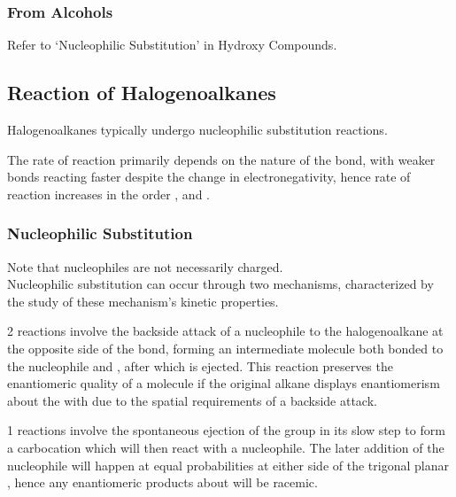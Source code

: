 \documentclass[../main]{subfiles}
\begin{document}
	\subsubsection{From Alcohols}

	Refer to `Nucleophilic Substitution' in Hydroxy Compounds.

	\subsection{Reaction of Halogenoalkanes}

	Halogenoalkanes typically undergo nucleophilic substitution reactions.

	The rate of reaction primarily depends on the nature of the  bond, with weaker bonds reacting faster despite the change in electronegativity, hence rate of reaction increases in the order , and . \\

	\subsubsection{Nucleophilic Substitution}


	Note that nucleophiles are not necessarily charged. \\

	Nucleophilic substitution can occur through two mechanisms, characterized by the study of these mechanism's kinetic properties.


	2 reactions involve the backside attack of a nucleophile to the halogenoalkane at the opposite side of the  bond, forming an intermediate molecule both bonded to the nucleophile and , after which  is ejected. This reaction preserves the enantiomeric quality of a molecule if the original alkane displays enantiomerism about the  with  due to the spatial requirements of a backside attack.


	1 reactions involve the spontaneous ejection of the  group in its slow step to form a carbocation which will then react with a nucleophile. The later addition of the nucleophile will happen at equal probabilities at either side of the trigonal planar , hence any enantiomeric products about  will be racemic. \\
\end{document}
